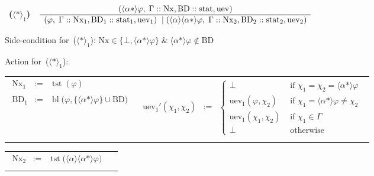 \documentclass{entcs}
\newcommand{\xand}{\;\&\;}
\newcommand{\pea}[2]{\langle#1\rangle #2}
\newcommand{\prp}[1]{#1*}
\newcommand{\tnode}[3]{(#1 :: #2 :: #3)}
\newcommand{\tnext}{\mathrm{Nx}}
\newcommand{\tbdia}{\mathrm{BD}}
\newcommand{\tmrk}{\mathrm{stat}}
\newcommand{\tuev}{\mathrm{uev}}
\newcommand{\trero}{$\pea{\prp{}}{}_1$}
\newcommand{\tfean}{\mathop{\mathrm{tst}}}
\newcommand{\tbl}{\mathop{\mathrm{bl}}}
\newcommand{\ds}{\displaystyle\strut}
\newcommand{\ruleone}[3]{
\mbox{ {\bf #1} \ $\frac{\ds \mbox{$#2$}}{\ds \mbox{$#3$}}$}}
\begin{document}
\begin{center}
  \ruleone{(\trero{})}
  {\tnode{\pea{\prp{\alpha}}{\varphi} , \; \Gamma}{\tnext, \tbdia}{\tmrk, \tuev}}
  {\begin{array}{l}
      \tnode{\varphi , \; \Gamma}{\tnext_1, \tbdia_1}{\tmrk_1, \tuev_1} \; \mid 
      \tnode{\pea{\alpha}{\pea{\prp{\alpha}}{\varphi}} , \; \Gamma}{\tnext_2, \tbdia_2}{\tmrk_2, \tuev_2}
  \end{array}}
\end{center}
Side-condition for~(\trero{}):
$\tnext \in \{ \bot, \pea{\prp{\alpha}}{\varphi} \} \xand \pea{\prp{\alpha}}{\varphi} \notin \tbdia$
\begin{flushleft}
  Action for~(\trero{}):
  \begin{tabular}[c]{lr}
    \begin{minipage}[c]{0.28\linewidth}
      \begin{eqnarray*}
        \tnext_1 & := & \tfean(\varphi)
        \\ \\
        \tbdia_1 & := & \tbl\big( \varphi, \{ \pea{\prp{\alpha}}{\varphi} \} \cup \tbdia \big)
      \end{eqnarray*}
    \end{minipage}
    &
    \begin{minipage}[c]{0.72\linewidth}
      \begin{eqnarray*}
        \tuev_1'(\chi_1, \chi_2) & := &
        \left\{
          \begin{array}{ll}
            \bot & \text{ if } \chi_1 = \chi_2 = \pea{\prp{\alpha}}{\varphi}\\
            \tuev_1(\varphi, \chi_2) & \text{ if } \chi_1 = \pea{\prp{\alpha}}{\varphi} \not= \chi_2\\
            \tuev_1(\chi_1, \chi_2) & \text{ if } \chi_1 \in \Gamma\\
            \bot & \text{ otherwise}
          \end{array}
        \right . \\
      \end{eqnarray*}
    \end{minipage}
  \end{tabular}
  \begin{tabular}[c]{lr}
    \begin{minipage}[c]{0.26\linewidth}
      \begin{eqnarray*}
        \tnext_2 & := & \tfean\big( \pea{\alpha}{\pea{\prp{\alpha}}{\varphi}} \big)
        \\[1em]

\end{eqnarray*}
\end{minipage}
\end{tabular}
\end{flushleft}
\end{document}

